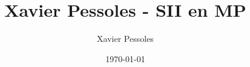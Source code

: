 \documentclass[
	fontsize=10pt, %
	twoside=true, %
]{kaobook}
\newcommand{\repRel}{../../..}
\newcommand{\repStyle}{\repRel/Style}
\begin{document}

\titlehead{Xavier Pessoles - SII en MP}
\title[Xavier Pessoles - SII en MP]{Xavier Pessoles - SII en MP}
\author[XP]{Xavier Pessoles}
\date{\today}


\begingroup %
\endgroup

%
\mainmatter %
%
%
%
%


\setcounter{margintocdepth}{\sectiontocdepth}
\marginlayout
\graphicspath{{\repStyle/png}}

\pagestyle{xp.scrheadings}


%



\newcommand{\repExo}{Application_01_ROV}
\newcommand{\nomExo}{Application_01_ROV}

\livrettrue %
\collefalse


%

%
%
%
\end{document}
